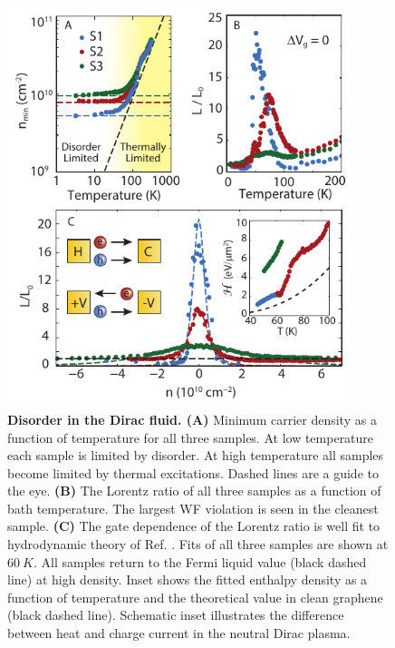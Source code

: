 \begin{figure}
\centering
\includegraphics[width=100mm]{figures/Dirac_fluid/Fig3.pdf}
\caption{\textbf{Disorder in the Dirac fluid.  (A)} Minimum carrier density as a function of temperature for all three samples.  At low temperature each sample is limited by disorder. At high temperature all samples become limited by thermal excitations.  Dashed lines are a guide to the eye. \textbf{(B)} The Lorentz ratio of all three samples as a function of bath temperature. The largest WF violation is seen in the cleanest sample. \textbf{(C)} The gate dependence of the Lorentz ratio is well fit to hydrodynamic theory of Ref. \cite{muller_quantum-critical_2008, foster_slow_2009}. Fits of all three samples are shown at $60~K$. All samples return to the Fermi liquid value (black dashed line) at high density. Inset shows the fitted enthalpy density as a function of temperature and the theoretical value in clean graphene (black dashed line). Schematic inset illustrates the difference between heat and charge current in the neutral Dirac plasma.}
\label{fig:DF_Fig3}
\end{figure}

